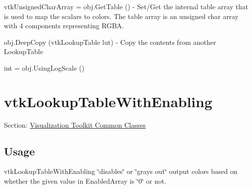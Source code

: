 \begin{DoxyItemize}
\item {\ttfamily vtk\-Unsigned\-Char\-Array = obj.\-Get\-Table ()} -\/ Set/\-Get the internal table array that is used to map the scalars to colors. The table array is an unsigned char array with 4 components representing R\-G\-B\-A.  
\item {\ttfamily obj.\-Deep\-Copy (vtk\-Lookup\-Table lut)} -\/ Copy the contents from another Lookup\-Table  
\item {\ttfamily int = obj.\-Using\-Log\-Scale ()}  
\end{DoxyItemize}\hypertarget{vtkcommon_vtklookuptablewithenabling}{}\section{vtk\-Lookup\-Table\-With\-Enabling}\label{vtkcommon_vtklookuptablewithenabling}
Section\-: \hyperlink{sec_vtkcommon}{Visualization Toolkit Common Classes} \hypertarget{vtkwidgets_vtkxyplotwidget_Usage}{}\subsection{Usage}\label{vtkwidgets_vtkxyplotwidget_Usage}
vtk\-Lookup\-Table\-With\-Enabling \char`\"{}disables\char`\"{} or \char`\"{}grays out\char`\"{} output colors based on whether the given value in Enabled\-Array is \char`\"{}0\char`\"{} or not.

